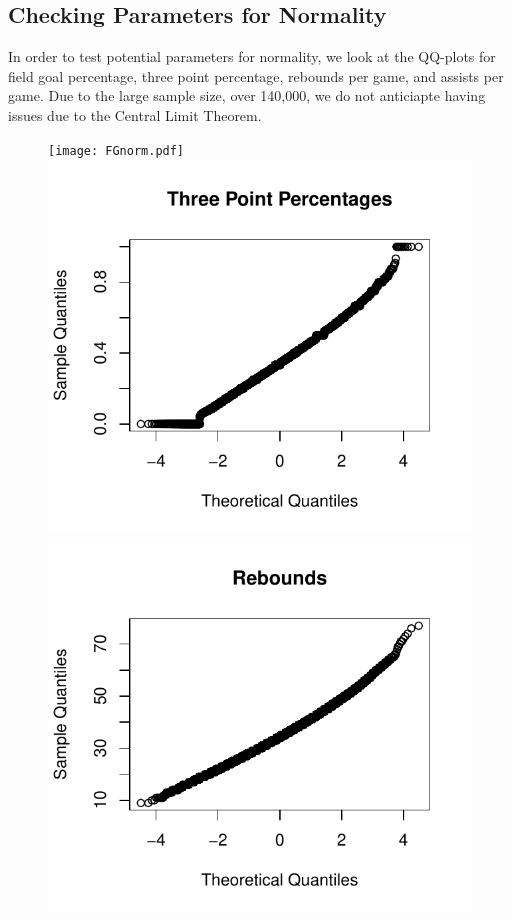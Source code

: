 \documentclass[]{scrartcl}
\begin{document}
\subsection*{Checking Parameters for Normality}
In order to test potential parameters for normality, we look at the QQ-plots for field goal percentage, three point percentage, rebounds per game, and assists per game. Due to the large sample size, over 140,000, we do not anticiapte having issues due to the Central Limit Theorem.  
\begin{figure}[H]
	\centering
	\texttt{[image: FGnorm.pdf]}
	\includegraphics[scale=.6]{3pnorm.pdf}
	\includegraphics[scale=.6]{rbnorm.pdf}

\end{figure}
\end{document}
